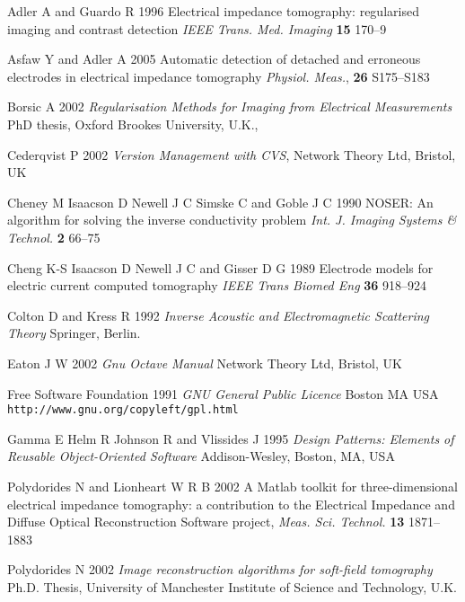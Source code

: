 \documentclass[12pt]{iopart}
\begin{document}
\begin{thebibliography}{99}

Adler A and Guardo R
1996
Electrical impedance tomography: regularised imaging and contrast detection 
\textit{IEEE Trans. Med. Imaging} \textbf{15} 170--9

Asfaw Y and Adler A
 2005
Automatic detection of detached and erroneous electrodes in electrical impedance tomography
{\it Physiol. Meas.}, {\bf 26} S175--S183

Borsic A 2002
{\it Regularisation Methods for Imaging from Electrical Measurements}
PhD thesis, Oxford Brookes University, U.K.,

Cederqvist P 2002
{\it Version Management with CVS},
Network Theory Ltd, Bristol, UK

Cheney M
Isaacson D
Newell J C
Simske C and
Goble J C 1990
NOSER: An algorithm for solving the inverse conductivity problem
\textit{Int. J. Imaging Systems \& Technol.} \textbf{2} 66--75


Cheng K-S
Isaacson D
Newell J C and
Gisser D G
1989
Electrode models for electric current
computed tomography
{\it IEEE Trans Biomed Eng}
{\bf 36} 918--924

Colton D and Kress R 1992
{\it Inverse Acoustic and Electromagnetic Scattering Theory}
Springer, Berlin.


Eaton J W 2002
{\it Gnu Octave Manual}
Network Theory Ltd, Bristol, UK

Free Software Foundation 1991
{\it GNU General Public Licence}
Boston MA USA
{\tt http://www.gnu.org/copyleft/gpl.html}

Gamma E Helm R Johnson R and Vlissides J 1995
{\it Design Patterns: Elements of Reusable Object-Oriented Software}
Addison-Wesley, Boston, MA, USA

Polydorides N and Lionheart W R B
2002
A Matlab toolkit for three-dimensional electrical impedance
tomography: a contribution to the Electrical Impedance and
Diffuse Optical Reconstruction Software project,
{\it Meas. Sci. Technol.} {\bf 13} 1871--1883 

Polydorides N 
2002
{\it Image reconstruction algorithms for soft-field tomography}
Ph.D. Thesis,
University of Manchester Institute of Science and Technology, U.K. 


\end{thebibliography}
\end{document}
